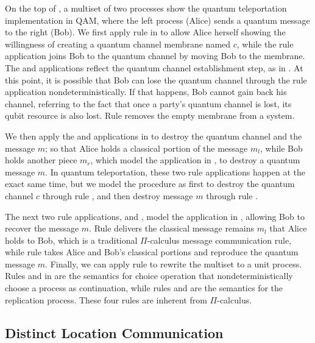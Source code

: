 On the top of , a multiset of two processes show the quantum teleportation implementation in QAM,
where the left process (Alice) sends a quantum message to the right (Bob).
We first apply rule  in 
to allow Alice herself showing the willingness of creating a quantum channel membrane named $c$,
while the  rule application joins Bob to the quantum channel by moving Bob to the membrane.
The  and  applications reflect the quantum channel establishment step, as  in .
At this point, it is possible that Bob can lose the quantum channel through the  rule application nondeterministically.
If that happens, Bob cannot gain back his channel,
referring to the fact that once a party's quantum channel is lost, its qubit resource is also lost.
Rule  removes the empty membrane from a system.

We then apply the  and  applications in  to destroy the quantum channel and the message $m$; so that Alice holds a classical portion of the message $m_l$, while Bob holds another piece $m_r$, which model the  application in , to destroy a quantum message $m$.
In quantum teleportation, these two rule applications happen at the exact same time,
but we model the procedure as first to destroy the quantum channel $c$ through rule ,
and then destroy message $m$ through rule . 

The next two rule applications,  and , model the  application in  , allowing Bob to recover the message $m$.
Rule  delivers the classical message remains $m_l$ that Alice holds to Bob, which is a traditional $\Pi$-calculus message communication rule, while rule  takes Alice and Bob's classical portions and reproduce the quantum message $m$.
Finally, we can apply rule  to rewrite the multiset to a unit process.
Rules  and  in  are the semantics for choice operation that nondeterministically choose a process as continuation, while rules  and  are the semantics for the replication process.
These four rules are inherent from $\Pi$-calculus.

\subsection{Distinct Location Communication} \label{sec:qamsyntax1}

